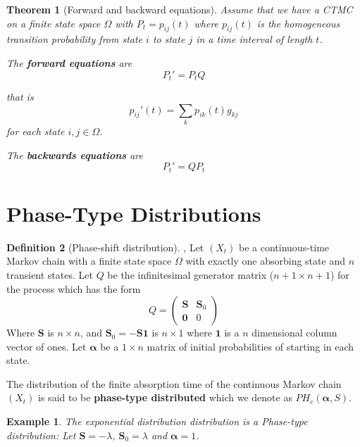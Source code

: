 \documentclass{article}
\theoremstyle{plain}
\newtheorem{theorem}{Theorem}[section]
\newtheorem{example}{Example}[theorem]
\theoremstyle{definition}
\newtheorem{defn}[theorem]{Definition}
\theoremstyle{remark}
\numberwithin{equation}{section}
\begin{document}
\begin{theorem}[Forward and backward equations] \cite{grimmett2001}
Assume that we have a CTMC on a finite state space $\Omega$ with $P_t = p_{ij}(t)$ where $p_{ij}(t)$ is the homogeneous transition probability from state $i$ to state $j$ in a time interval of length $t$.

The \textbf{forward equations} are
\begin{equation}
    \label{eq:forward_eqs}
    P_t' = P_t Q
\end{equation}

that is
$$
p_{ij}'(t) = \sum_{k} p_{ik}(t) g_{kj}
$$
for each state $i,j \in \Omega$.

The \textbf{backwards equations} are
\begin{equation}
    \label{eq:backwards_eqs}
    P_t' = Q P_t
\end{equation}
\end{theorem}

\section{Phase-Type Distributions}

\begin{defn}[Phase-shift distribution] %
\cite{neuts1981}, \cite{maier1992}
Let $(X_t)$ be a continuous-time Markov chain with a finite state space $\Omega$ with exactly one absorbing state and $n$ transient states.
Let $Q$ be the infinitesimal generator matrix ($n + 1 \times n + 1$) for the process which has the form
$$
Q = \begin{pmatrix}
\mathbf{S} & \mathbf{S}_0\\
\mathbf{0} & 0
\end{pmatrix}
$$
Where $\mathbf{S}$ is $n \times n$, and $\mathbf{S}_0 = - \mathbf{S} \mathbf{1}$ is $n \times 1$ where $\mathbf{1}$ is a $n$ dimensional column vector of ones.
Let $\boldsymbol{\alpha}$ be a $1 \times n$ matrix of initial probabilities of starting in each state.

The distribution of the finite absorption time of the  continuous Markov chain $(X_t)$ is said to be \textbf{phase-type distributed} which we denote as $PH_c(\boldsymbol{\alpha}, S)$.
\end{defn}

\begin{example}
The exponential distribution distribution is a Phase-type distribution:
Let $\mathbf S = - \lambda$, $\mathbf{S}_0 = \lambda$ and $\boldsymbol{\alpha} = 1$.
\end{example}
\end{document}

